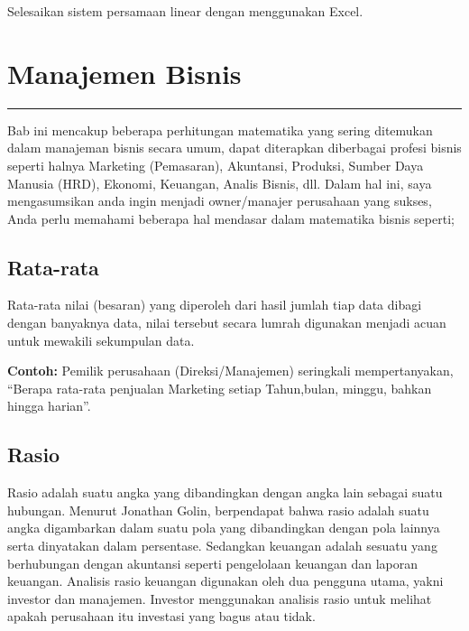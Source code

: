 \documentclass[
]{book}
\begin{document}
Selesaikan sistem persamaan linear dengan menggunakan Excel.

\hypertarget{Manajemen-Bisnis}{%
\chapter{Manajemen Bisnis}\label{Manajemen-Bisnis}}

\begin{center}\rule{0.5\linewidth}{0.5pt}\end{center}

Bab ini mencakup beberapa perhitungan matematika yang sering ditemukan dalam manajeman bisnis secara umum, dapat diterapkan diberbagai profesi bisnis seperti halnya Marketing (Pemasaran), Akuntansi, Produksi, Sumber Daya Manusia (HRD), Ekonomi, Keuangan, Analis Bisnis, dll. Dalam hal ini, saya mengasumsikan anda ingin menjadi owner/manajer perusahaan yang sukses, Anda perlu memahami beberapa hal mendasar dalam matematika bisnis seperti;

\hypertarget{rata-rata}{%
\section{Rata-rata}\label{rata-rata}}

Rata-rata nilai (besaran) yang diperoleh dari hasil jumlah tiap data dibagi dengan banyaknya data, nilai tersebut secara lumrah digunakan menjadi acuan untuk mewakili sekumpulan data.

\textbf{Contoh:} Pemilik perusahaan (Direksi/Manajemen) seringkali mempertanyakan, ``Berapa rata-rata penjualan Marketing setiap Tahun,bulan, minggu, bahkan hingga harian''.

\hypertarget{rasio}{%
\section{Rasio}\label{rasio}}

Rasio adalah suatu angka yang dibandingkan dengan angka lain sebagai suatu hubungan. Menurut Jonathan Golin, berpendapat bahwa rasio adalah suatu angka digambarkan dalam suatu pola yang dibandingkan dengan pola lainnya serta dinyatakan dalam persentase. Sedangkan keuangan adalah sesuatu yang berhubungan dengan akuntansi seperti pengelolaan keuangan dan laporan keuangan. Analisis rasio keuangan digunakan oleh dua pengguna utama, yakni investor dan manajemen. Investor menggunakan analisis rasio untuk melihat apakah perusahaan itu investasi yang bagus atau tidak.
\end{document}
